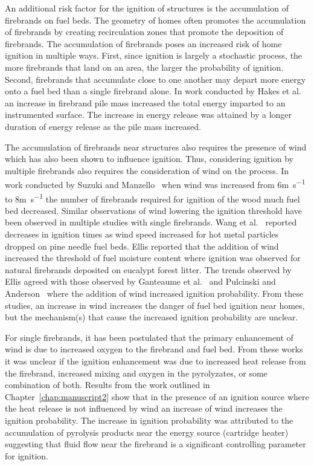     An additional risk factor for the ignition of structures is the accumulation of firebrands on fuel beds. The geometry of homes often promotes the accumulation of firebrands by creating recirculation zones that promote the deposition of firebrands. The accumulation of firebrands poses an increased risk of home ignition in multiple ways. First, since ignition is largely a stochastic process, the more firebrands that land on an area, the larger the probability of ignition. Second, firebrands that accumulate close to one another may depart more energy onto a fuel bed than a single firebrand alone. In work conducted by Hakes et al.~\cite{Hakes2019a} an increase in firebrand pile mass increased the total energy imparted to an instrumented surface. The increase in energy release was attained by a longer duration of energy release as the pile mass increased.
    
    The accumulation of firebrands near structures also requires the presence of wind which has also been shown to influence ignition. Thus, considering ignition by multiple firebrands also requires the consideration of wind on the process. In work conducted by Suzuki and Manzello~\cite{Suzuki2020a} when wind was increased from 6\si{\meter\per\second} to 8\si{\meter\per\second} the number of firebrands required for ignition of the wood much fuel bed decreased. Similar observations of wind lowering the ignition threshold have been observed in multiple studies with single firebrands. Wang et al.~\cite{Wang2017} reported decreases in ignition times as wind speed increased for hot metal particles dropped on pine needle fuel beds. Ellis reported that the addition of wind increased the threshold of fuel moisture content where ignition was observed for natural firebrands deposited on eucalypt forest litter. The trends observed by Ellis agreed with those observed by Ganteaume et al.~\cite{Ganteaume2009} and Pulcinski and Anderson~\cite{Plucinski2008} where the addition of wind increased ignition probability. From these studies, an increase in wind increases the danger of fuel bed ignition near homes, but the mechanism(s) that cause the increased ignition probability are unclear. 
    
    For single firebrands, it has been postulated that the primary enhancement of wind is due to increased oxygen to the firebrand and fuel bed. From these works it was unclear if the ignition enhancement was due to increased heat release from the firebrand, increased mixing and oxygen in the pyrolyzates, or some combination of both. Results from the work outlined in Chapter~\ref{chap:manuscript2} show that in the presence of an ignition source where the heat release is not influenced by wind an increase of wind increases the ignition probability. The increase in ignition probability was attributed to the accumulation of pyrolysis products near the energy source (cartridge heater) suggesting that fluid flow near the firebrand is a significant controlling parameter for ignition. 
    
